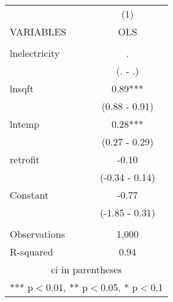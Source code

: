 \begin{tabular}{lc} \hline
 & (1) \\
VARIABLES & OLS \\ \hline
 &  \\
lnelectricity & . \\
 & (. - .) \\
lnsqft & 0.89*** \\
 & (0.88 - 0.91) \\
lntemp & 0.28*** \\
 & (0.27 - 0.29) \\
retrofit & -0.10 \\
 & (-0.34 - 0.14) \\
Constant & -0.77 \\
 & (-1.85 - 0.31) \\
 &  \\
Observations & 1,000 \\
 R-squared & 0.94 \\ \hline
\multicolumn{2}{c}{ ci in parentheses} \\
\multicolumn{2}{c}{ *** p$<$0.01, ** p$<$0.05, * p$<$0.1} \\
\end{tabular}
